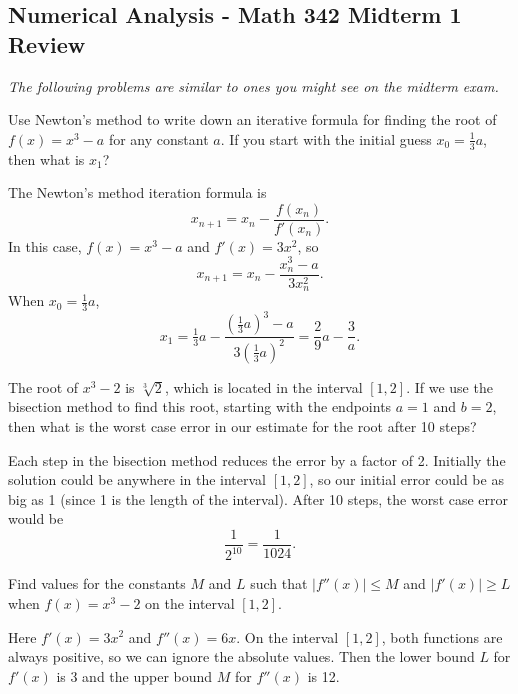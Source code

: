 \documentclass[11pt,answers]{exam}
\begin{document}
\pagestyle{empty}
\graphicspath{{/home/brian/Dropbox/HSC/Spring16/Math111/}}

\subsection*{Numerical Analysis - Math 342 \hfill Midterm 1 Review}

\textit{The following problems are similar to ones you might see on the midterm exam.}

\begin{questions}

\question Use Newton's method to write down an iterative formula for finding the root of $f(x) = x^3-a$ for any constant $a$.  If you start with the initial guess $x_0 = \frac{1}{3}a$, then what is $x_1$?    

\begin{solution}
The Newton's method iteration formula is 
$$x_{n+1} = x_n - \frac{f(x_n)}{f'(x_n)}.$$
In this case, $f(x) = x^3 - a$ and $f'(x) = 3x^2$, so
$$x_{n+1} = x_n - \frac{x_n^3 - a}{3x_n^2}.$$
When $x_0 = \tfrac{1}{3}a$, 
$$x_1 = \tfrac{1}{3}a - \frac{(\tfrac{1}{3}a)^3 - a}{3(\frac{1}{3}a)^2} = \frac{2}{9}a - \frac{3}{a}.$$
\end{solution}

\question The root of $x^3-2$ is $\sqrt[3]{2}$, which is located in the interval $[1,2]$.  If we use the bisection method to find this root, starting with the endpoints $a=1$ and $b=2$, then what is the worst case error in our estimate for the root after 10 steps?  
\begin{solution}
Each step in the bisection method reduces the error by a factor of 2.  Initially the solution could be anywhere in the interval $[1,2]$, so our initial error could be as big as 1 (since 1 is the length of the interval).  After 10 steps, the worst case error would be 
$$\frac{1}{2^{10}} = \frac{1}{1024}.$$  
\end{solution}


\question Find values for the constants $M$ and $L$ such that $|f''(x)| \le M$ and $|f'(x)| \ge L$ when $f(x) = x^3-2$ on the interval $[1,2]$.  

\begin{solution}
Here $f'(x) = 3x^2$ and $f''(x) = 6x$.  On the interval $[1,2]$, both functions are always positive, so we can ignore the absolute values.  Then the lower bound $L$ for $f'(x)$ is $3$ and the upper bound $M$ for $f''(x)$ is 12.  
\end{solution}


\end{questions}
\end{document}
